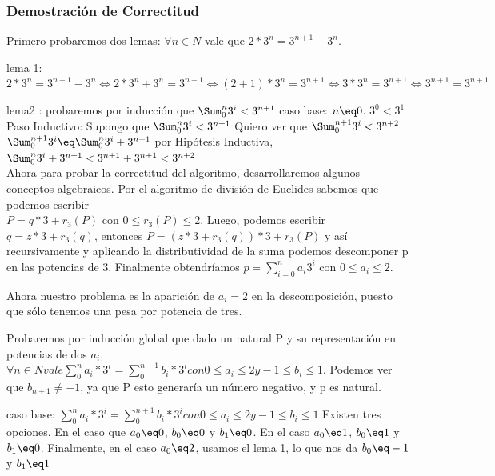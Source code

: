 \documentclass[spanish,12pt]{article}
\begin{document}
\subsubsection{Demostración de Correctitud}

Primero probaremos dos lemas:
$\forall n \in N$ vale que  $2*3^{n} = 3^{n+1}-3^{n}$.

lema 1:$ 2*3^{n} = 3^{n+1}-3^{n} \Longleftrightarrow 2*3^{n}+3^{n} = 3^{n+1} \Longleftrightarrow (2+1)*3^{n} = 3^{n+1} \Longleftrightarrow   3*3^{n} = 3^{n+1} \Longleftrightarrow  3^{n+1} = 3^{n+1}$ 

lema2 : probaremos por inducción que $ \Sum_{0}^{n}{3^{i}} < 3^{n+1}$
caso base: $n \eq 0$. $3^{0} < 3^{1}$
Paso Inductivo: 
	Supongo que $ \Sum_{0}^{n}{3^{i}} < 3^{n+1}$
	Quiero ver que $ \Sum_{0}^{n+1}{3^{i}} < 3^{n+2}$
	$ \Sum_{0}^{n+1}{3^{i}} \eq \Sum_{0}^{n}{3^{i}} + 3^{n+1}$
	por Hipótesis Inductiva, $\Sum_{0}^{n}{3^{i}} + 3^{n+1} < 3^{n+1} + 3^{n+1} < 3^{n+2} $
\\
Ahora para probar la correctitud del algoritmo, desarrollaremos algunos conceptos algebraicos.
Por el algoritmo de división de Euclides sabemos que podemos escribir \\  $P= q*3+ r_{3}(P)$ con $0\leq r_{3}(P) \leq 2 $. Luego, podemos escribir $q= z*3 + r_{3}(q)$, entonces $P= (z*3 + r_{3}(q))*3 +r_{3}(P)$ y así recursivamente y aplicando la distributividad de la suma podemos descomponer p en las potencias de 3. Finalmente obtendríamos $p= \sum_{i=0}^{n}{a_i 3^{i}} $ con $0 \leq a_i \leq 2$.

Ahora nuestro problema es la aparición de $a_i=2$ en la descomposición, puesto que sólo tenemos una pesa por potencia de tres.

Probaremos por inducción global  que dado un natural P y su representación en potencias de dos $a_{i}$, $ \forall n \in N vale  \sum_{0}^{n}{a_{i}*3^{i}}= \sum_{0}^{n+1}{b_{i}*3^{i}} con 0\leq a_{i} \leq 2 y -1 \leq b_{i} \leq 1$. Podemos ver que $b_{n+1}\neq -1$, ya que P esto generaría un número negativo, y p es natural.

caso base:  
$\sum_{0}^{n}{a_{i}*3^{i}}= \sum_{0}^{n+1}{b_{i}*3^{i}} con 0\leq a_{i} \leq 2 y -1 \leq b_{i} \leq 1$
Existen tres opciones. En el caso que $a_{0} \eq 0$, $b_{0} \eq 0$ y $b_{1} \eq 0$.
En el caso $a_{0} \eq 1$, $b_{0} \eq 1$ y $b_{1} \eq 0$.
Finalmente, en el caso $a_{0} \eq 2$, usamos el lema 1, lo que nos da $b_{0} \eq -1$ y $b_{1} \eq 1$
\end{document}
